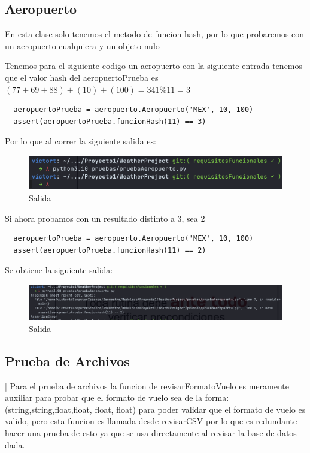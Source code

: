 \documentclass[12pt]{article}
\begin{document}
\subsection{Aeropuerto}
En esta clase solo tenemos el metodo de funcion hash, por lo que probaremos con un aeropuerto cualquiera y un objeto nulo

Tenemos para el siguiente codigo un aeropuerto con la siguiente entrada tenemos que el valor hash del aeropuertoPrueba es $(77+69+88)+(10)+(100)=341\%11=3$
\begin{verbatim}
  aeropuertoPrueba = aeropuerto.Aeropuerto('MEX', 10, 100)
  assert(aeropuertoPrueba.funcionHash(11) == 3)
\end{verbatim}
Por lo que al correr la siguiente salida es:
\begin{figure}[h!]
  \centering
  \includegraphics[scale=0.6]{pruebasPy/aeropuerto/hash1.png}
  \caption{Salida}
\end{figure}

Si ahora probamos con un resultado distinto a 3, sea 2
\begin{verbatim}
  aeropuertoPrueba = aeropuerto.Aeropuerto('MEX', 10, 100)
  assert(aeropuertoPrueba.funcionHash(11) == 2)
\end{verbatim}
Se obtiene la siguiente salida:
\begin{figure}[h!]
  \centering
  \includegraphics[scale=0.4]{pruebasPy/aeropuerto/hash2.png}
  \caption{Salida}
\end{figure}
\subsection{Prueba de Archivos}|
Para el prueba de archivos la funcion de revisarFormatoVuelo es meramente auxiliar para probar que el formato de vuelo sea de la forma: (string,string,float,float, float, float) para poder validar que el formato de vuelo es valido, pero esta funcion es llamada desde revisarCSV por lo que es redundante hacer una prueba de esto ya que se usa directamente al revisar la base de datos dada.
\end{document}
